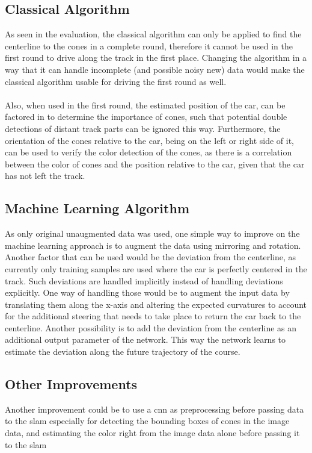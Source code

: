 \subsection{Classical Algorithm}
As seen in the evaluation, the classical algorithm can only be applied to find the centerline to the cones in a complete round, therefore it cannot be used in the first round to drive along the track in the first place. Changing the algorithm in a way that it can handle incomplete (and possible noisy new) data would make the classical algorithm usable for driving the first round as well. \\
\\Also, when used in the first round, the estimated position of the car, can be factored in to determine the importance of cones, such that potential double detections of distant track parts can be ignored this way. Furthermore, the orientation of the cones relative to the car, being on the left or right side of it, can be used to verify the color detection of the cones, as there is a correlation between the color of cones and the position relative to the car, given that the car has not left the track.
\subsection{Machine Learning Algorithm}
As  only original unaugmented data was used, one simple way to improve on the machine learning approach is to augment the data using mirroring and rotation. Another factor that can be used would be the deviation from the centerline, as currently only training samples are used where the car is perfectly centered in the track. Such deviations are handled implicitly instead of handling deviations explicitly. One way of handling those would be to augment the input data by translating them along the x-axis and altering the expected curvatures to account for the additional steering that needs to take place to return the car back to the centerline. Another possibility is to add the deviation from the centerline as an additional output parameter of the network. This way the network learns to estimate the deviation along the future trajectory of the course.
\subsection{Other Improvements}
Another improvement could be to use a \ac{cnn} as preprocessing before passing data to the \ac{slam} especially for detecting the bounding boxes of cones in the image data, and estimating the color right from the image data alone before passing it to the slam
